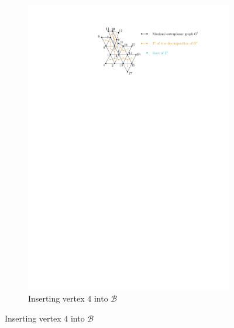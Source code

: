 \begin{figure}[H]
\begin{subfigure}{0.49\textwidth}
\includegraphics[page=3,width=\linewidth]{graphics/maximal_outerplanar_example_drawings.pdf}
\caption{Inserting vertex $4$ into $\mathcal{B}$}
\end{subfigure}
\end{figure}
